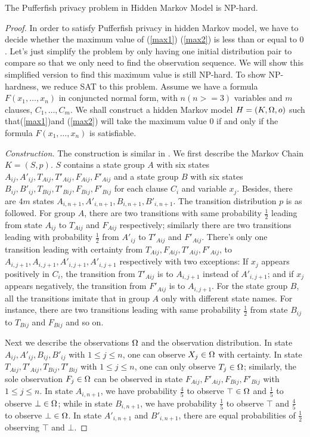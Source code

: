 \begin{theorem}
  The Pufferfish privacy problem in Hidden Markov Model is NP-hard.
\end{theorem}

\begin{proof}
  In order to satisfy Pufferfish privacy in hidden Markov model, we have to decide whether
  the maximum value of (\ref{max1}) (\ref{max2}) is less than or equal to $0$.
  Let's just simplify the problem by only having one initial distribution pair to compare
  so that we only need to find the observation sequence.
  We will show this simplified version to find this maximum value is still NP-hard.
  To show NP-hardness, we reduce SAT to this problem. Assume we have a formula $F(x_1,\ldots,x_n)$ in conjuncted normal form,
  with $n(n>=3)$ variables and $m$ clauses, $C_1,\ldots,C_m$. We shall construct a hidden Markov model $H = (K, \Omega, o)$
  such that(\ref{max1})and (\ref{max2}) will take the maximum value $0$
  if and only if the formula $F(x_1,\ldots,x_n)$ is satisfiable.

  \textit{Construction.} The construction is similar in \cite{PCT:87:CMDP}. We first describe the Markov Chain $K =
  (S, p)$. $S$ contains a state group $A$ with six states $A_{ij},A'_{ij},T_{A ij},T'_{Aij},F_{Aij},F'_{Aij}$ and
  a state group $B$ with six states $B_{ij},B'_{ij},T_{Bij},T'_{Bij},F_{Bij},F'_{Bij}$
  for each clause $C_i$ and variable $x_j$. Besides, there are $4m$ states $A_{i,n+1},A'_{i,n+1},B_{i,n+1},B'_{i,n+1}$.
  The transition distribution $p$ is as followed. For group $A$, there are two transitions with same probability $\frac{1}{2}$ leading from
  state $A_{ij}$ to $T_{Aij}$ and $F_{Aij}$ respectively; similarly there are two transitions leading with probability $\frac{1}{2}$
  from $A'_{ij}$ to $T'_{Aij}$ and $F'_{Aij}$. There's only one transition leading with certainty from $T_{Aij},F_{Aij},T'_{Aij},F'_{Aij}$,
  to $A_{i,j+1},A_{i,j+1},A'_{i,j+1},A'_{i,j+1}$ respectively with two exceptions: If $x_j$ appears positively in $C_i$,
  the transition from $T'_{Aij}$ is to $A_{i,j+1}$ instead of $A'_{i,j+1}$; and if $x_j$ appears negatively, the transition from
  $F'_{Aij}$ is to $A_{i,j+1}$. For the state group $B$, all the transitions imitate that in group $A$ only with different state names.
  For instance, there are two transitions leading with same probability $\frac{1}{2}$ from state $B_{ij}$ to $T_{Bij}$ and $F_{Bij}$ and so on.

  Next we describe the observations $\Omega$ and the observation distribution. In state
  $A_{ij},A'_{ij},B_{ij},B'_{ij}$ with $1\leq j \leq n$, one can observe $X_j \in \Omega$ with certainty.
  In state $T_{Aij},T'_{Aij},T_{Bij},T'_{Bij}$ with $1\leq j \leq n$, one can only observe $T_j \in \Omega$;
  similarly, the sole observation $F_j \in \Omega$ can be observed in state $F_{Aij},F'_{Aij},F_{Bij},F'_{Bij}$ with $1\leq j \leq n$.
  In state $A_{i,n+1}$, we have probability $\frac{4}{5}$ to observe $\top \in \Omega$ and $\frac{1}{5}$  to observe $\bot \in \Omega$;
  while in state $B_{i,n+1}$, we have probability $\frac{1}{5}$ to observe $\top$ and $\frac{4}{5}$  to observe $\bot \in \Omega$.
  In state $A'_{i,n+1}$ and $B'_{i,n+1}$, there are equal probabilities of $\frac{1}{2}$ observing $\top$ and $\bot$.


\end{proof}
